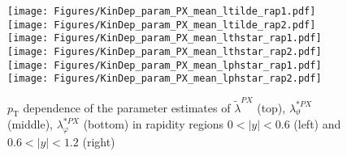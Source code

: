 \documentclass[12pt]{article}
\newcommand{\pT}{p_\mathrm{T}}
\newcommand{\absy}{\left |  y \right |}
\newcommand{\lamtildePX}{\tilde{\lambda}^{\scriptscriptstyle PX}}
\newcommand{\lamthstarPX}{\lambda^{* \scriptscriptstyle PX}_\vartheta}
\newcommand{\lamphstarPX}{\lambda^{* \scriptscriptstyle PX}_\varphi}
\begin{document}
\begin{figure}[htbp]
\centering
\texttt{[image: Figures/KinDep\_param\_PX\_mean\_ltilde\_rap1.pdf]}
\texttt{[image: Figures/KinDep\_param\_PX\_mean\_ltilde\_rap2.pdf]}
\texttt{[image: Figures/KinDep\_param\_PX\_mean\_lthstar\_rap1.pdf]}
\texttt{[image: Figures/KinDep\_param\_PX\_mean\_lthstar\_rap2.pdf]}
\texttt{[image: Figures/KinDep\_param\_PX\_mean\_lphstar\_rap1.pdf]}
\texttt{[image: Figures/KinDep\_param\_PX\_mean\_lphstar\_rap2.pdf]}
\caption{$\pT$ dependence of the parameter estimates of $\lamtildePX$ (top),
$\lamthstarPX$ (middle), $\lamphstarPX$ (bottom) in rapidity regions $0<\absy<0.6$ (left) and $0.6<\absy<1.2$ (right)}
\end{figure}
\clearpage
\end{document}
